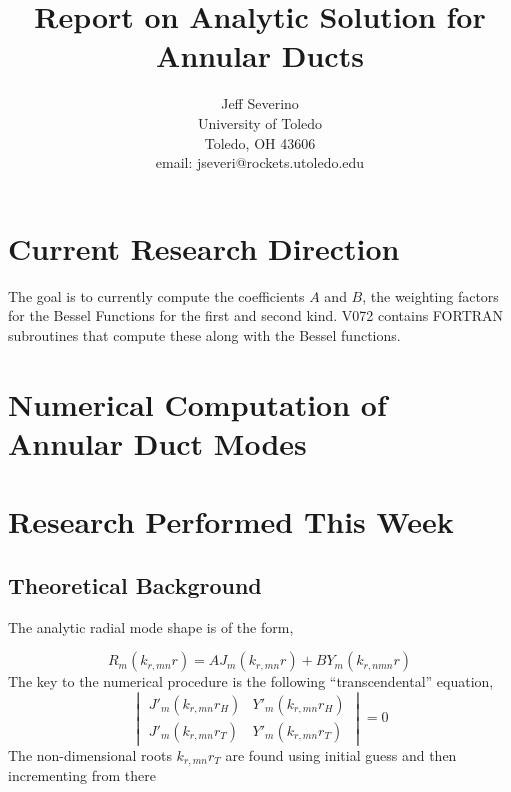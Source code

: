 \documentclass[12pt]{article}
\begin{document}
\begin{titlepage}
\title{
Report on Analytic Solution for Annular Ducts}


\author{ Jeff Severino
 \\
University of Toledo \\
Toledo, OH  43606 \\
email: jseveri@rockets.utoledo.edu  }

\maketitle

\end{titlepage}

\section{Current Research Direction}
 The goal is to currently compute the coefficients $A$ and $B$, the weighting
 factors for the Bessel Functions for the first and second kind. V072
 contains FORTRAN subroutines that compute these along with the Bessel functions.
 \section{Numerical Computation of Annular Duct Modes}

  
\section{Research Performed This Week}
\subsection{Theoretical Background}

The analytic radial mode shape is of the form,

\begin{equation}
    R_m(k_{r,mn} r) =  A J_m (k_{r,mn} r) + B Y_m (k_{r,nmn} r)
\end{equation}
The key to the numerical procedure is the following ``transcendental'' equation,
\begin{equation}
    \begin{vmatrix}
        J'_m(k_{r,mn} r_H) &Y'_m(k_{r,mn} r_H) \\
        J'_m(k_{r,mn} r_T) &Y'_m(k_{r,mn} r_T) 
    \end{vmatrix}   
    = 0
\end{equation}
 The non-dimensional roots $k_{r,mn} r_T$ are found using initial guess and then incrementing from there
\end{document}
